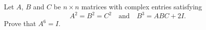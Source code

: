 Let \(A\), \(B\) and \(C\) be \(n \times n\) matrices with complex entries satisfying
\[
A^2 = B^2 = C^2 \quad \text{and} \quad B^3 = ABC + 2I.
\]
Prove that \(A^6 = I\).
